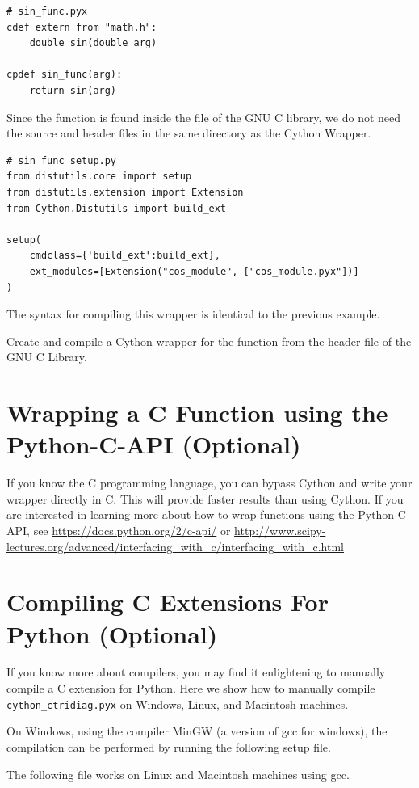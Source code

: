 \begin{lstlisting}
# sin_func.pyx
cdef extern from "math.h":
    double sin(double arg)
    
cpdef sin_func(arg):
    return sin(arg) 
\end{lstlisting}

Since the  function is found inside the  file of the GNU C library, we do not need the source and header files in the same directory as the Cython Wrapper.

\begin{lstlisting}
# sin_func_setup.py
from distutils.core import setup
from distutils.extension import Extension
from Cython.Distutils import build_ext

setup(
    cmdclass={'build_ext':build_ext},
    ext_modules=[Extension("cos_module", ["cos_module.pyx"])]
)
\end{lstlisting}
 
The syntax for compiling this wrapper is identical to the previous example.

\begin{problem}
Create and compile a Cython wrapper for the  function from the  header file of the GNU C Library.
\end{problem}

\section*{Wrapping a C Function using the Python-C-API (Optional)}
If you know the C programming language, you can bypass Cython and write your wrapper directly in C. This will provide faster results than using Cython. If you are interested in learning more about how to wrap functions using the Python-C-API, see \url{https://docs.python.org/2/c-api/} or \url{http://www.scipy-lectures.org/advanced/interfacing_with_c/interfacing_with_c.html}

\section*{Compiling C Extensions For Python (Optional)}
If you know more about compilers, you may find it enlightening to manually compile a C extension for Python.
Here we show how to manually compile \texttt{cython\_ctridiag.pyx} on Windows, Linux, and Macintosh machines.

On Windows, using the compiler MinGW (a version of gcc for windows), the compilation can be performed by running the following setup file.



The following file works on Linux and Macintosh machines using gcc.


%
